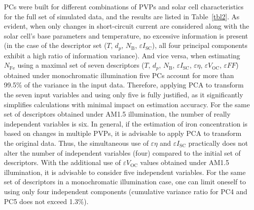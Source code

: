 \documentclass[a4paper,fleqn]{cas-sc}
\begin{document}
PCs were built for different combinations of PVPs and solar cell characteristics
for the full set of simulated data, and the results are listed in Table~\ref{tbl2}.
As evident, when only changes in short-circuit current are considered along with the solar cell's base parameters and temperature,
no excessive information is present (in the case of the descriptor set ($T$, $d_p$, $N_\mathrm{B}$, $\varepsilon I_\mathrm{SC}$),
all four principal components exhibit a high ratio of information variance).
And vice versa, when estimating $N_\mathrm{Fe}$ using a maximal set of
seven descriptors ($T$, $d_p$, $N_\mathrm{B}$, $\varepsilon I_\mathrm{SC}$, $\varepsilon \eta$, $\varepsilon V_\mathrm{OC}$, $\varepsilon F\!F$)
obtained under monochromatic illumination five PCs account for more than 99.5\% of the variance in the input data.
Therefore, applying PCA to transform the seven input variables and using only five is fully justified,
as it significantly simplifies calculations with minimal impact on estimation accuracy.
For the same set of descriptors obtained under AM1.5 illumination,
the number of really independent variables is six.
In general, if the estimation of iron concentration is based on changes in multiple PVPs,
it is advisable to apply PCA to transform the original data.
Thus, the simultaneous use of $\varepsilon \eta$ and $\varepsilon I_\mathrm{SC}$ practically does not alter
the number of independent variables (four) compared to the initial set of descriptors.
With the additional use of $\varepsilon V_\mathrm{OC}$ values obtained under AM1.5 illumination, it is advisable to consider five independent variables.
For the same set of descriptors in a monochromatic illumination case, one can limit oneself to using only four independent components
(cumulative variance ratio for PC4 and PC5 does not exceed 1.3\%).
\end{document}
